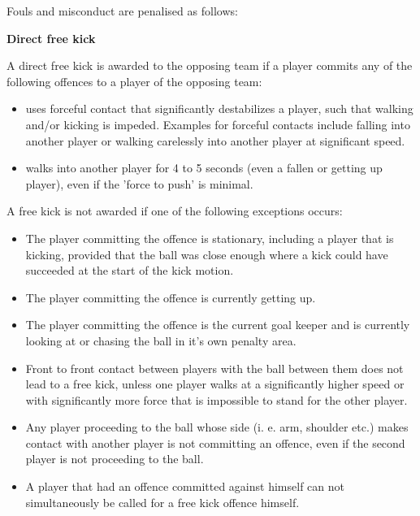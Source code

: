 \clearpage
\sffamily
{\bfseries\color[rgb]{0.4,0.4,0.4}{Law 12 -- Fouls and Misconduct} }
{}

\bigskip

Fouls and misconduct are penalised as follows:

\bigskip

{\bfseries Direct free kick }

\headlinebox

A direct free kick is awarded to the opposing team if a player commits any of the following offences to a player of the opposing team:
\begin{itemize}
\item uses forceful contact that significantly destabilizes a player, such that walking and/or kicking is impeded. Examples for forceful contacts include falling into another player or walking carelessly into another player at significant speed.
\item walks into another player for 4 to 5 seconds (even a fallen or getting up player), even if the 'force to push' is minimal.
\end{itemize}

A free kick is not awarded if one of the following exceptions occurs: 
\begin{itemize}
\item The player committing the offence is stationary, including a player that is kicking, provided that the ball was close enough where a kick could have succeeded at the start of the kick motion.
\item The player committing the offence is currently getting up.
\item The player committing the offence is the current goal keeper and is currently looking at or chasing the ball in it's own penalty area.
\item Front to front contact between players with the ball between them does not lead to a free kick, unless one player walks at a significantly higher speed or with significantly more force that is impossible to stand for the other player.
\item Any player proceeding to the ball whose side (i. e. arm, shoulder etc.)  makes contact with another player is not committing an offence, even if the second player is not proceeding to the ball.
\item A player that had an offence committed against himself can not simultaneously be called for a free kick offence himself.
\end{itemize}


